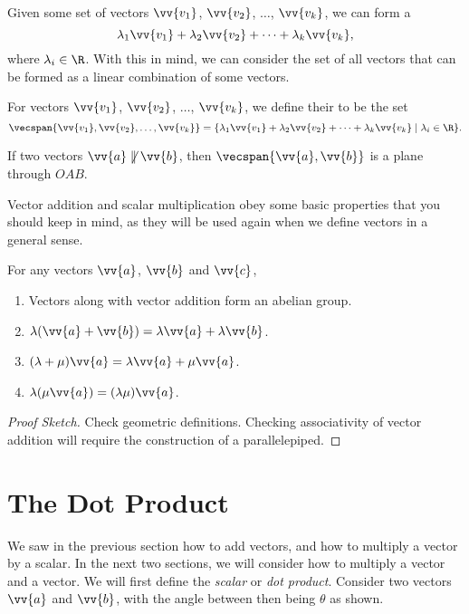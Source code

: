 Given some set of vectors $\vv{v_1}$, $\vv{v_2}$, $\dots$, $\vv{v_k}$, we can form a 
$$
\lambda_1 \vv{v_1} + \lambda_2 \vv{v_2}  + \cdots + \lambda_k \vv{v_k},
$$
where $\lambda_i \in \R$. With this in mind, we can consider the set of all vectors that can be formed as a linear combination of some vectors.

\begin{definition}[Span]
	For vectors $\vv{v_1}$, $\vv{v_2}$, $\dots$, $\vv{v_k}$, we define their  to be the set
	$$
	\vecspan\{\vv{v_1}, \vv{v_2}, \dots, \vv{v_k} \} = \{ \lambda_1 \vv{v_1} + \lambda_2 \vv{v_2}  + \cdots + \lambda_k \vv{v_k} \mid \lambda_i \in \R \}.
	$$
\end{definition}

If two vectors $\vv{a} \not \parallel \vv{b}$, then $\vecspan\{\vv{a}, \vv{b}\}$ is a plane through $OAB$.

Vector addition and scalar multiplication obey some basic properties that you should keep in mind, as they will be used again when we define vectors in a general sense.

\begin{proposition}
For any vectors $\vv{a}$, $\vv{b}$ and $\vv{c}$,
\begin{enumerate}[label=(\roman*)]
	\item Vectors along with vector addition form an abelian group.
	\item $\lambda(\vv{a} + \vv{b}) = \lambda \vv{a} + \lambda \vv{b}$.
	\item $(\lambda + \mu)\vv{a} = \lambda\vv{a} + \mu\vv{a}$.
	\item $\lambda(\mu \vv{a}) = (\lambda \mu) \vv{a}$.
\end{enumerate}
\end{proposition}
\begin{proof}[Proof Sketch]
	Check geometric definitions. Checking associativity of vector addition will require the construction of a parallelepiped.
\end{proof}


\section{The Dot Product}

We saw in the previous section how to add vectors, and how to multiply a vector by a scalar. In the next two sections, we will consider how to multiply a vector and a vector. 
We will first define the \emph{scalar} or \emph{dot product}.
Consider two vectors $\vv{a}$ and $\vv{b}$, with the angle between then being $\theta$ as shown.

